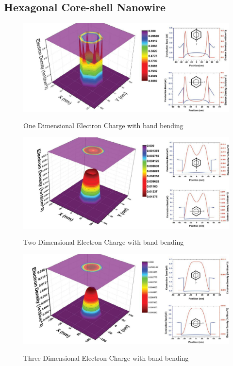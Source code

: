 \subsection{Hexagonal Core-shell Nanowire} \label{sec:indv_lines}

\begin{figure}
  \caption{One Dimensional Electron Charge with band bending}
  \centering
  \includegraphics[width=\textwidth]{pictures/ED/1DCharge}
  \label{1DCharge}
\end{figure}

\begin{figure}
  \caption{Two Dimensional Electron Charge with band bending}
  \centering
  \includegraphics[width=\textwidth]{pictures/ED/2DCharge}
  \label{2DCharge}
\end{figure}

\begin{figure}
  \caption{Three Dimensional Electron Charge with band bending}
  \centering
  \includegraphics[width=\textwidth]{pictures/ED/3DCharge}
  \label{3DCharge}
\end{figure}

